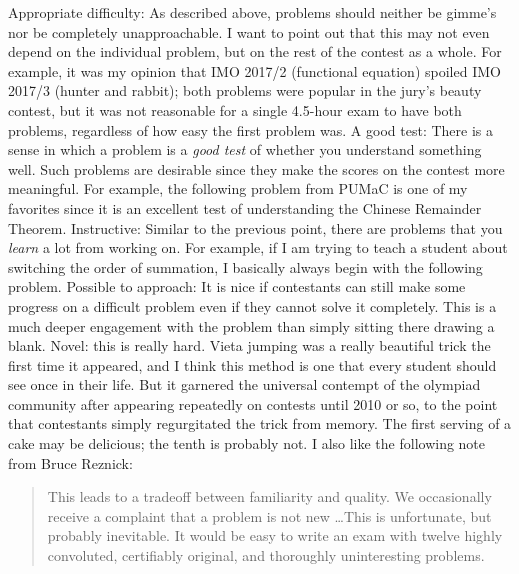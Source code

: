 \documentclass[11pt]{scrartcl}
\theoremstyle{inlined}
\begin{document}
\begin{itemize}
  \ii \alert{Appropriate difficulty}:
  As described above, problems should neither be gimme's
  nor be completely unapproachable.
  I want to point out that this may not even depend on the individual problem,
  but on the rest of the contest as a whole.
  For example, it was my opinion that
  IMO 2017/2 (functional equation) spoiled IMO 2017/3 (hunter and rabbit);
  both problems were popular in the jury's beauty contest,
  but it was not reasonable for a single 4.5-hour exam
  to have both problems, regardless of how easy the first problem was.
  \ii \alert{A good test}:
  There is a sense in which a problem is a \emph{good test}
  of whether you understand something well.
  Such problems are desirable since they make the scores
  on the contest more meaningful.
  For example, the following problem from PUMaC is one of my
  favorites since it is an excellent test of understanding
  the Chinese Remainder Theorem.
  \ii \alert{Instructive}:
  Similar to the previous point,
  there are problems that you \emph{learn} a lot from working on.
  For example, if I am trying to teach a student about
  switching the order of summation,
  I basically always begin with the following problem.
  \ii \alert{Possible to approach}:
  It is nice if contestants can still make some progress
  on a difficult problem even if they cannot solve it completely.
  This is a much deeper engagement with the problem
  than simply sitting there drawing a blank.
  \ii \alert{Novel}: this is really hard.
  Vieta jumping was a really beautiful trick the first time it appeared,
  and I think this method is one that every student should see once in their life.
  But it garnered the universal contempt of the olympiad community
  after appearing repeatedly on contests until 2010 or so,
  to the point that contestants simply regurgitated the trick from memory.
  The first serving of a cake may be delicious; the tenth is probably not.
  I also like the following note from Bruce Reznick:
  \begin{quote}
     This leads to a tradeoff between familiarity and quality.
     We occasionally receive a complaint that a problem
     is not new \dots This is unfortunate, but probably inevitable.
     It would be easy to write an exam with twelve highly convoluted,
     certifiably original, and thoroughly uninteresting problems.
  \end{quote}
\end{itemize}
\end{document}
